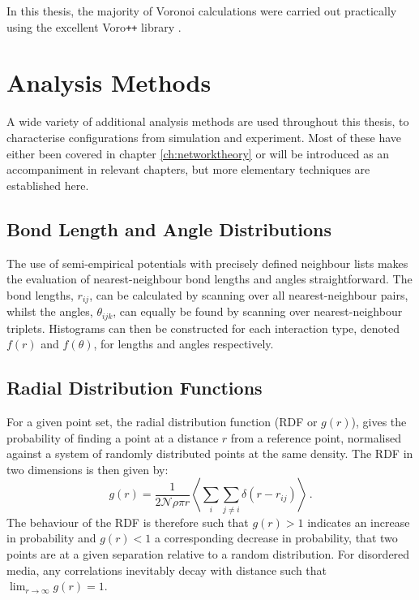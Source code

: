 In this thesis, the majority of Voronoi calculations were carried out practically using the excellent Voro\texttt{++} library \cite{Rycroft2009}.

\section{Analysis Methods}

A wide variety of additional analysis methods are used throughout this thesis, to characterise configurations from simulation and experiment.
Most of these have either been covered in chapter \ref{ch:networktheory} or will be introduced as an accompaniment in relevant chapters, but more elementary techniques are established here.

\subsection{Bond Length and Angle Distributions}

The use of semi\--empirical potentials with precisely defined neighbour lists makes the evaluation of nearest\--neighbour bond lengths and angles straightforward.
The bond lengths, $r_{ij}$, can be calculated by scanning over all nearest\--neighbour pairs, whilst the angles, $\theta_{ijk}$, can equally be found by scanning over nearest\--neighbour triplets.
Histograms can then be constructed for each interaction type, denoted $f\left(r\right)$ and $f\left(\theta\right)$, for lengths and angles respectively.

\subsection{Radial Distribution Functions}

For a given point set, the radial distribution function (RDF or $g\left(r\right)$), gives the probability of finding a point at a distance $r$ from a reference point, normalised against a system of randomly distributed points at the same density.  
The RDF in two dimensions is then given by:
\begin{equation}
	g\left(r\right)=\frac{1}{2 \mathcal{N} \rho \pi r}\left\langle \sum_i \sum_{j\neq i} \delta\left(r-r_{ij}\right)\right\rangle\,. 
\end{equation} 
The behaviour of the RDF is therefore such that $g\left(r\right)>1$ indicates an increase in probability and $g\left(r\right)<1$ a corresponding decrease in probability, that two points are at a given separation relative to a random distribution.
For disordered media, any correlations inevitably decay with distance such that $\lim_{r\rightarrow \infty} g\left(r\right)=1$.

